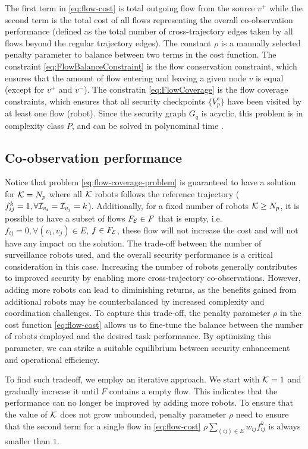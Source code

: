 \documentclass[journal]{IEEEtran}  %
\begin{document}
The first term in \ref{eq:flow-cost} is total outgoing flow from the source $v^{+}$ while the second term is the total cost of all flows representing the overall co-observation performance (defined as the total number of cross-trajectory edges taken by all flows beyond the regular trajectory edges). The constant $\rho$ is a manually selected penalty parameter to balance between two terms in the cost function. The constraint \eqref{eq:FlowBalanceConstraint} is the flow conservation constraint, which ensures that the amount of flow entering and leaving a given node $v$ is equal (except for $v^{+}$ and $v^{-}$). The constratin \eqref{eq:FlowCoverage} is the flow coverage constraints, which ensures that all security checkpoints $ \{V^{s}_{p}\}$ have been visited by at least one flow (robot). Since the security graph $G_{q}$ is acyclic, this problem is in complexity class $P$, and can be solved in polynominal time \cite{ntafos1979path}. 

\subsection{Co-observation performance}
Notice that problem \eqref{eq:flow-coverage-problem} is guaranteed to have a solution for $\mathcal{K}=N_{p}$ where all $\mathcal{K}$ robots follows the reference trajectory ($f^{k}_{ij}=1, \forall \mathcal{I}_{v_{i}}=\mathcal{I}_{v_{j}}=k$).  Additionally, for a fixed number of robots $\mathcal{K} \geq N_{p}$, it is possible to have a subset of flows $F_{\mathcal{E}} \in F$ that is empty, i.e. $f_{ij}=0, \forall (v_{i},v_{j})\in E$, $f\in F_{\mathcal{E}}$, these flow will not increase the cost and will not have any impact on the solution.  
The trade-off between the number of surveillance robots used, and the overall security performance is a critical consideration in this case. Increasing the number of robots generally contributes to improved security by enabling more cross-trajectory co-observations. However, adding more robots can lead to diminishing returns, as the benefits gained from additional robots may be counterbalanced by increased complexity and coordination challenges. To capture this trade-off, the penalty parameter $\rho$ in the cost function \ref{eq:flow-cost} allows us to fine-tune the balance between the number of robots employed and the desired task performance. By optimizing this parameter, we can strike a suitable equilibrium between security enhancement and operational efficiency.

To find such tradeoff, we employ an iterative approach. We start with $\mathcal{K}=1$ and gradually increase it until $F$ contains a empty flow. This indicates that the performance can no longer be improved by adding more robots. To ensure that the value of $\mathcal{K}$ does not grow unbounded, penalty parameter $\rho$ need to ensure that the second term for a single flow in \eqref{eq:flow-cost} $ \rho \sum_{(ij)\in E} w_{ij} f^k_{ij}$ is always smaller than $1$.
\end{document}
